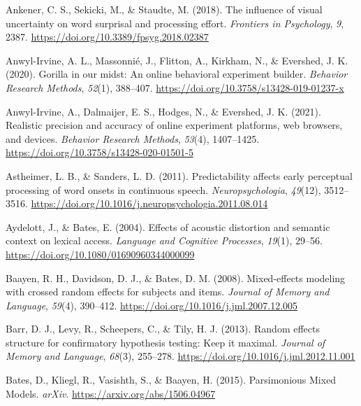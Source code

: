 \documentclass[a4paper, nobind]{templates/ociamthesis}
\newlength{\cslhangindent}
\newenvironment{CSLReferences}[2] %
 {%
  \setlength{\parindent}{0pt}
  \ifodd #1
  \let\oldpar\par
  \def\par{\hangindent=\cslhangindent\oldpar}
  \fi
  \setlength{\parskip}{1mm}
  \setlength{\baselineskip}{6mm}
 }%
 {}
\begin{document}
\begin{CSLReferences}{1}{0}
\leavevmode{}%
Ankener, C. S., Sekicki, M., \& Staudte, M. (2018). {The influence of visual uncertainty on word surprisal and processing effort}. \emph{Frontiers in Psychology}, \emph{9}, 2387. \url{https://doi.org/10.3389/fpsyg.2018.02387}

\leavevmode{}%
Anwyl-Irvine, A. L., Massonnié, J., Flitton, A., Kirkham, N., \& Evershed, J. K. (2020). {Gorilla in our midst: An online behavioral experiment builder}. \emph{Behavior Research Methods}, \emph{52}(1), 388--407. \url{https://doi.org/10.3758/s13428-019-01237-x}

\leavevmode{}%
Anwyl-Irvine, A., Dalmaijer, E. S., Hodges, N., \& Evershed, J. K. (2021). {Realistic precision and accuracy of online experiment platforms, web browsers, and devices}. \emph{Behavior Research Methods}, \emph{53}(4), 1407--1425. \url{https://doi.org/10.3758/s13428-020-01501-5}

\leavevmode{}%
Astheimer, L. B., \& Sanders, L. D. (2011). {Predictability affects early perceptual processing of word onsets in continuous speech}. \emph{Neuropsychologia}, \emph{49}(12), 3512--3516. \url{https://doi.org/10.1016/j.neuropsychologia.2011.08.014}

\leavevmode{}%
Aydelott, J., \& Bates, E. (2004). {Effects of acoustic distortion and semantic context on lexical access}. \emph{Language and Cognitive Processes}, \emph{19}(1), 29--56. \url{https://doi.org/10.1080/01690960344000099}

\leavevmode{}%
Baayen, R. H., Davidson, D. J., \& Bates, D. M. (2008). {Mixed-effects modeling with crossed random effects for subjects and items}. \emph{Journal of Memory and Language}, \emph{59}(4), 390--412. \url{https://doi.org/10.1016/j.jml.2007.12.005}

\leavevmode{}%
Barr, D. J., Levy, R., Scheepers, C., \& Tily, H. J. (2013). Random effects structure for confirmatory hypothesis testing: Keep it maximal. \emph{Journal of Memory and Language}, \emph{68}(3), 255--278. \url{https://doi.org/10.1016/j.jml.2012.11.001}

\leavevmode{}%
Bates, D., Kliegl, R., Vasishth, S., \& Baayen, H. (2015). {Parsimonious Mixed Models}. \emph{arXiv}. \url{https://arxiv.org/abs/1506.04967}


\end{CSLReferences}
\end{document}
